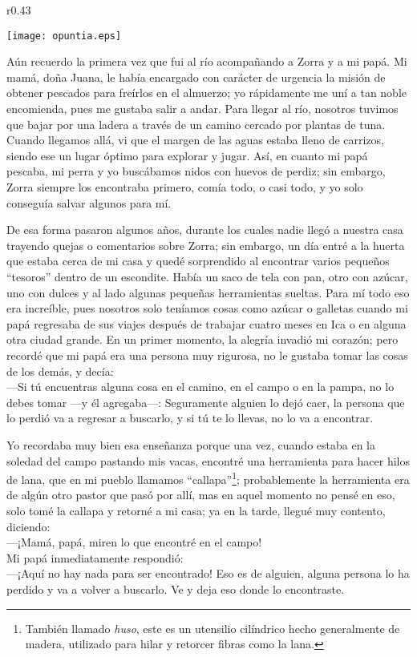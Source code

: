 \ifdefined\EnableIncludeImages
\begin{wrapfigure}{r}{0.43\textwidth}
  \begin{center}
  \vspace{-30pt}
    \texttt{[image: opuntia.eps]}
  \end{center}
  \vspace{-20pt}
\end{wrapfigure}
\fi
Aún recuerdo la primera vez que fui al río acompañando a Zorra y a mi papá. 
Mi mamá, doña Juana, le había encargado con carácter de urgencia la misión de obtener pescados para freírlos en el almuerzo; 
yo rápidamente me uní a tan noble encomienda, pues me gustaba salir a andar.
Para llegar al río, nosotros tuvimos que bajar por una ladera a través de un camino cercado por plantas de tuna. 
Cuando llegamos allá, vi que el margen de las aguas estaba lleno de carrizos, siendo ese un lugar óptimo para explorar y jugar. 
Así, en cuanto mi papá pescaba, mi perra y yo buscábamos nidos con huevos de perdiz; 
sin embargo, Zorra siempre los encontraba primero, comía todo, o casi todo, y yo solo conseguía salvar algunos para mí. 

De esa forma pasaron algunos años, durante los cuales nadie llegó a nuestra casa trayendo quejas o comentarios sobre Zorra; 
sin embargo, un día entré a la huerta que estaba cerca de mi casa y quedé sorprendido al encontrar varios pequeños ``tesoros'' dentro de un escondite. 
Había un saco de tela con pan, otro con azúcar, uno con dulces y al lado algunas pequeñas herramientas sueltas.
Para mí todo eso era increíble, pues nosotros solo teníamos cosas como azúcar o galletas cuando mi papá regresaba de sus viajes después de trabajar cuatro meses en Ica o en alguna otra ciudad grande. 
En un primer momento, la alegría invadió mi corazón; pero recordé que mi papá era una persona muy rigurosa, no le gustaba tomar las cosas de los demás, y decía: \\\indent
---Si tú encuentras alguna cosa en el camino, en el campo o en la pampa, no lo debes tomar ---y él agregaba---: 
Seguramente alguien lo dejó caer, la persona que lo perdió va a regresar a buscarlo, y si tú te lo llevas, no lo va a encontrar.

Yo recordaba muy bien esa enseñanza porque una vez, cuando estaba en la soledad del campo pastando mis vacas, encontré una herramienta para hacer hilos de lana, que en mi pueblo llamamos ``callapa''\footnote{También llamado \textit{huso}, este es un utensilio cilíndrico hecho generalmente de madera, utilizado para hilar y retorcer fibras como la lana.}; probablemente la herramienta era de algún otro pastor que pasó por allí, mas en aquel momento no pensé en eso, solo tomé la callapa y retorné a mi casa; ya en la tarde, llegué muy contento, diciendo:\\\indent
---¡Mamá, papá, miren lo que encontré en el campo!\\\indent
Mi papá inmediatamente respondió:\\\indent
---¡Aquí no hay nada para ser encontrado! Eso es de alguien, alguna persona lo ha perdido y va a volver a buscarlo. 
Ve y deja eso donde lo encontraste.

